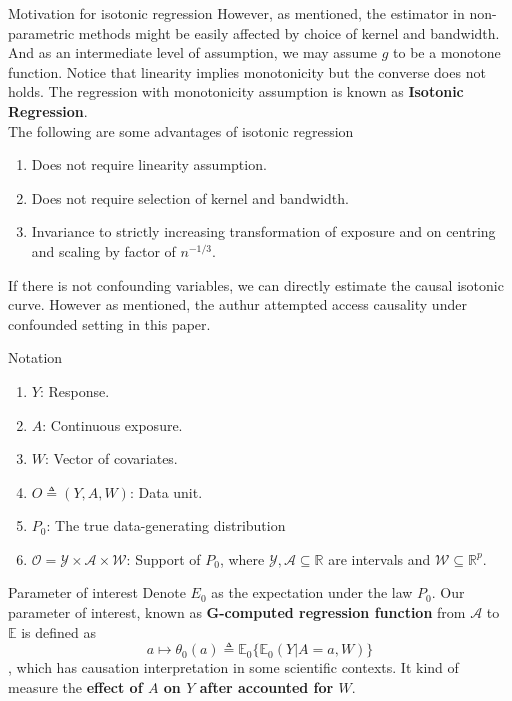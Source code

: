 \documentclass{beamer}
\newcommand{\defn}{\triangleq}
\newcommand{\E}{\mathbb{E}}
\newcommand{\R}{\mathbb{R}}
\begin{document}
\begin{frame}{Motivation for isotonic regression}
	However, as mentioned, the estimator in non-parametric methods might be easily affected by choice of kernel and bandwidth. And as an intermediate level of assumption, we may assume $g$ to be a monotone function. Notice that linearity implies monotonicity but the converse does not holds. The regression with monotonicity assumption is known as \textbf{Isotonic Regression}.\\
	The following are some advantages of isotonic regression
	\begin{enumerate}
		\item Does not require linearity assumption.
		\item Does not require selection of kernel and bandwidth.
		\item Invariance to strictly increasing transformation of exposure and on centring and scaling by factor of $n^{-1/3}$.
	\end{enumerate}
    If there is not confounding variables, we can directly estimate the causal isotonic curve. However as mentioned, the authur attempted access causality under confounded setting in this paper.
\end{frame}



\begin{frame}{Notation}
	\begin{enumerate}
		\item $Y$: Response.
		\item $A$: Continuous exposure.
		\item $W$: Vector of covariates.
		\item $O\defn (Y,A,W)$: Data unit.
		\item $P_0$: The true data-generating distribution
		\item $\mathcal{O}=\mathcal{Y}\times \mathcal{A}\times\mathcal{W}$: Support of $P_0$, where $\mathcal{Y},\mathcal{A}\subseteq \R$ are intervals and $\mathcal{W}\subseteq \R^p$.
	\end{enumerate}
\end{frame}

\begin{frame}{Parameter of interest}
	Denote $E_0$ as the expectation under the law $P_0$. Our parameter of interest, known as \textbf{G-computed regression function} from $\mathcal{A}$ to $\E$ is defined as
	$$
	a\mapsto \theta_0(a)\defn \E_0\big\{\E_0(Y|A=a,W) \big\}
	$$
	, which has causation interpretation in some scientific contexts. It kind of measure the \textbf{effect of $A$ on $Y$ after accounted for $W$}.
\end{frame}
\end{document}
